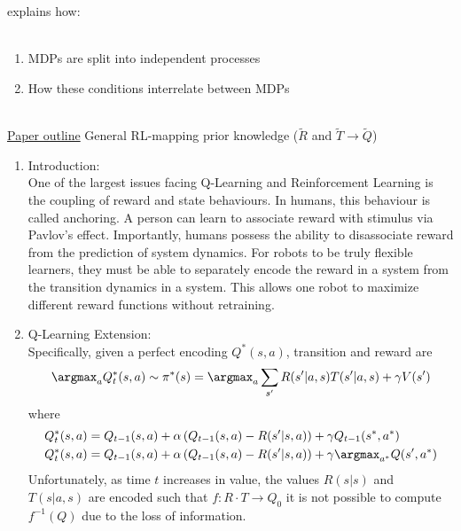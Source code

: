  explains how: \\

\\
\begin{enumerate}
\item MDPs are split into independent processes
\item How these conditions interrelate between MDPs
\end{enumerate}

 \\

\underline{Paper outline} \circled{$\alpha$} General RL-mapping prior knowledge ($\tilde{R}$ and $\tilde{T}\to\tilde{Q}$)\\

\begin{enumerate}[label=1.0.\arabic*]
\item Introduction: \\
One of the largest issues facing Q-Learning and Reinforcement Learning is the coupling of reward and state behaviours. In humans, this behaviour is called anchoring. A person can learn to associate reward with stimulus via Pavlov's effect. Importantly, humans possess the ability to disassociate reward from the prediction of system dynamics. For robots to be truly flexible learners, they must be able to separately encode the reward in a system from the transition dynamics in a system.  This allows one robot to maximize different reward functions without retraining.\\

\item Q-Learning Extension: \\
Specifically, given a perfect encoding $Q^\ast(s, a)$, transition and reward are 
\begin{equation}
\argmax_{a} Q_t^\ast(s,a)\sim\pi^\ast(s) = \argmax_{a} \sum_{s^\prime} R( s^\prime | a, s ) T( s^\prime | a, s ) + \gamma V( s^\prime )
\end{equation}
where
\begin{align}
Q^\ast_t(s,a) & = Q_{t-1}(s,a)+\alpha \left( Q_{t-1}( s, a ) - R( s^\prime | s, a ) \right) + \gamma Q_{t-1} ( s^\ast, a^\ast ) \\
Q^\ast_t(s,a) & = Q_{t-1}(s,a)+\alpha \left( Q_{t-1}( s, a ) - R( s^\prime | s, a ) \right) + \gamma \argmax_{a^\ast} Q ( s^\prime, a^\ast )
\end{align}
Unfortunately, as time $t$ increases in value, the values $R(s|s)$ and $T(s|a,s)$ are encoded such that $f:R\cdot T\to Q_0$ it is not possible to compute $f^{-1}(Q)$ due to the loss of information. 


\end{enumerate}
